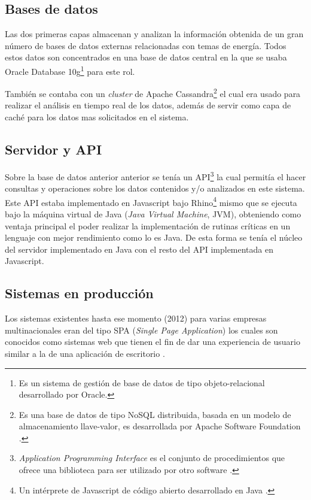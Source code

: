 \subsection{Bases de datos}
Las dos primeras capas almacenan y analizan la información obtenida
de un gran número de bases de datos externas relacionadas con temas
de energía. Todos estos datos son concentrados en una base de datos
central en la que se usaba Oracle Database 10g\footnote{Es un sistema de
  gestión de base de datos de tipo objeto-relacional desarrollado por Oracle.}
para este rol.

También se contaba con un \textit{cluster} de Apache Cassandra\footnote{Es
  una base de datos de tipo NoSQL distribuida, basada en un modelo de
  almacenamiento llave-valor, es desarrollada por Apache Software
  Foundation \cite{19_apache_cassandra}.} el cual era usado para realizar
el análisis en tiempo real de los datos, además de servir como capa
de caché para los datos mas solicitados en el sistema.

\subsection{Servidor y API}
Sobre la base de datos anterior anterior se tenía un API\footnote{
  \textit{Application Programming Interface} es el conjunto de procedimientos
  que ofrece una biblioteca para ser utilizado por otro
  software \cite{3_sommerville_2011}.}
la cual permitía el hacer consultas y operaciones sobre los datos contenidos
y/o analizados en este sistema.
Este API estaba implementado en Javascript bajo Rhino\footnote{Un intérprete
  de Javascript de código abierto desarrollado en Java \cite{20_mozilla_rhino}.}
mismo que se ejecuta bajo la máquina virtual de Java (\textit{Java Virtual Machine},
JVM), obteniendo como ventaja principal el poder realizar la implementación
de rutinas críticas en un lenguaje con mejor rendimiento como lo es Java.
De esta forma se tenía el núcleo del servidor implementado en Java con el
resto del API implementada en Javascript.

\subsection{Sistemas en producción}
Los sistemas existentes hasta ese momento (2012) para varias empresas multinacionales
eran del tipo SPA (\textit{Single Page Application}) los cuales son conocidos como
sistemas web que tienen el fin de dar una experiencia de usuario similar a la
de una aplicación de escritorio \cite{21_mikowski_powell}.

